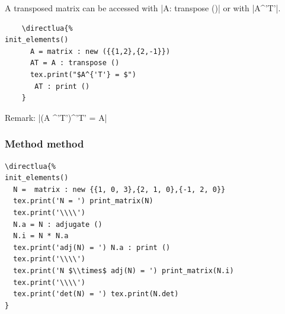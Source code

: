 A transposed matrix can be accessed with |A: transpose ()| or with |A^{'T'}|.

\vspace{.5em}
\begin{minipage}{.6\textwidth}
  \begin{Verbatim}
    \directlua{%
init_elements()
      A = matrix : new ({{1,2},{2,-1}}) 
      AT = A : transpose ()
      tex.print("$A^{'T'} = $")
       AT : print ()
    }
  \end{Verbatim}
\end{minipage}
\begin{minipage}{.4\textwidth}
\end{minipage}

\vspace{.5em}
Remark: |(A ^'T')^'T' = A|


\subsubsection{Method method  } %
\label{ssub:method_adjugate}

\begin{minipage}{.6\textwidth}
\begin{Verbatim}
\directlua{%
init_elements()
  N =  matrix : new {{1, 0, 3},{2, 1, 0},{-1, 2, 0}}
  tex.print('N = ') print_matrix(N)
  tex.print('\\\\')
  N.a = N : adjugate ()
  N.i = N * N.a
  tex.print('adj(N) = ') N.a : print ()
  tex.print('\\\\')
  tex.print('N $\\times$ adj(N) = ') print_matrix(N.i)
  tex.print('\\\\')
  tex.print('det(N) = ') tex.print(N.det)
}
\end{Verbatim}
\end{minipage}
\begin{minipage}{.4\textwidth}
\end{minipage}


